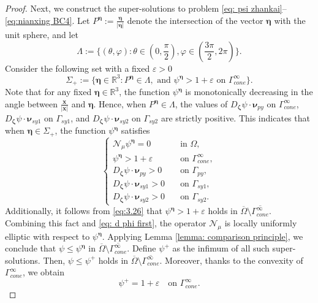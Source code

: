 \documentclass[10pt,a4paper]{amsart}
\begin{document}
\begin{proof}
    Next, we construct the super-solutions to problem \eqref{eq: psi zhankai}--\eqref{eq:nianxing BC4}. Let $P^{\bm{\eta}}:=\frac{\bm{\eta}}{|\bm{\eta}|}$ denote the intersection of the vector $\bm{\eta}$ with the unit sphere, and let
    \begin{equation*}
         \Lambda:=\{(\theta,\varphi):\theta\in(0,\frac{\pi}{2}),\varphi\in(\frac{3\pi}{2},2\pi)\}.
    \end{equation*}
    Consider the following set with a fixed $\varepsilon>0$
	\begin{equation}\label{eq:4.8}
		\Sigma_{+}:=\{\bm{\eta}\in\mathbb{R}^{3}: P^{\bm{\eta}}\in \Lambda, \text{ and }{\psi}^{\bm{\eta}}>1+\varepsilon\text{ on }\Gamma_{cone}^{\infty}\}.
	\end{equation}
    Note that for any fixed $\bm{\eta}\in \mathbb{R}^{3}$, the function ${\psi}^{\bm{\eta}}$ is monotonically decreasing in the angle between $\frac{\bm{x}}{|\bm{x}|}$ and $\bm{\eta}$. Hence, when $P^{\bm{\eta}}\in \Lambda$, the values of $D_{\bm{\zeta}}\psi\cdot\bm{\nu}_{py}$ on $\Gamma^{\infty}_{cone}$, $D_{\bm{\zeta}}\psi\cdot\bm{\nu}_{sy1}$ on $\Gamma_{sy1}$, and $D_{\bm{\zeta}}\psi\cdot\bm{\nu}_{sy2}$ on $\Gamma_{sy2}$ are strictly positive. This indicates that
   when $\bm{\eta}\in \Sigma_{+}$, the function ${\psi}^{\bm{\eta}}$ satisfies
	\begin{equation*}
		\begin{cases}
			\mathcal{N}_\mu {\psi}^{\bm{\eta}}= 0\quad&\text{in $\Omega$},\\
			{\psi}^{\bm{\eta}}>1+\varepsilon\quad&\text{on $\Gamma_{cone}^{\infty}$},\\
            D_{\bm{\zeta}}\psi\cdot\bm{\nu}_{py}>0\quad&\text{on $\Gamma_{py}$},\\
			D_{\bm{\zeta}}\psi\cdot\bm{\nu}_{sy1}>0\quad&\text{on $\Gamma_{sy1}$},\\
                D_{\bm{\zeta}}\psi\cdot\bm{\nu}_{sy2}>0\quad&\text{on $\Gamma_{sy2}$}.
		\end{cases}
	\end{equation*}
   Additionally, it follows from \eqref{eq:3.26} that ${\psi}^{\bm{\eta}}>1+\varepsilon$ holds in $\overline{\Omega}\setminus\overline{\Gamma_{cone}^{\infty}}$. Combining this fact and \eqref{eq: d phi first}, the operator $\mathcal{N}_\mu $ is locally uniformly elliptic with respect to ${\psi}^{\bm{\eta}}$. Applying Lemma \ref{lemma: comparison principle}, we conclude that $\psi\leq {\psi}^{\bm{\eta}}$ in $\overline{\Omega}\setminus\overline{\Gamma_{cone}^{\infty}}$. Define $\psi^+$ as the infimum of all such super-solutions. Then, $\psi\leq \psi^+$ holds in $\overline{\Omega}\setminus\overline{\Gamma_{cone}^{\infty}}$. Moreover, thanks to the convexity of $\Gamma_{cone}^{\infty}$, we obtain
	\begin{equation*}
		\psi^+=1+\varepsilon\quad\text{on $\Gamma_{cone}^{\infty}$}.
	\end{equation*}
  

\end{proof}
\end{document}
